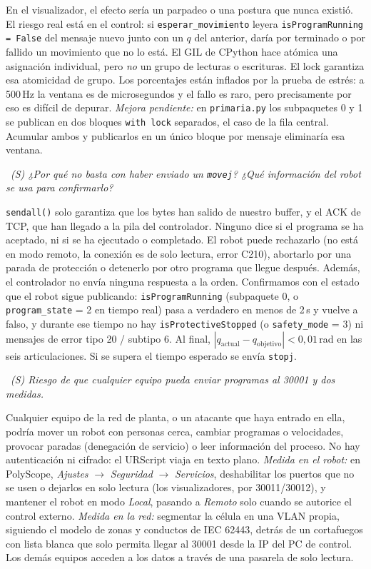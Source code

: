 \documentclass[10pt,a4paper]{article}
\newcommand{\code}[1]{\texttt{\small #1}}
\newcommand{\preg}[2]{\par\smallskip\noindent{\color{azul}\bfseries P#1.}~{\itshape #2}\par\nopagebreak}
\begin{document}
En el visualizador, el efecto sería un parpadeo o una postura que nunca existió. El riesgo real está en el control: si \code{esperar\_movimiento} leyera \code{isProgramRunning = False} del mensaje nuevo junto con un $q$ del anterior, daría por terminado o por fallido un movimiento que no lo está. El GIL de CPython hace atómica una asignación individual, pero \emph{no} un grupo de lecturas o escrituras. El lock garantiza esa atomicidad de grupo. Los porcentajes están inflados por la prueba de estrés: a 500\,Hz la ventana es de microsegundos y el fallo es raro, pero precisamente por eso es difícil de depurar. \emph{Mejora pendiente:} en \code{primaria.py} los subpaquetes 0 y 1 se publican en dos bloques \code{with lock} separados, el caso de la fila central. Acumular ambos y publicarlos en un único bloque por mensaje eliminaría esa ventana.

\preg{9}{(S) ¿Por qué no basta con haber enviado un \code{movej}? ¿Qué información del robot se usa para confirmarlo?}
\code{sendall()} solo garantiza que los bytes han salido de nuestro buffer, y el ACK de TCP, que han llegado a la pila del controlador. Ninguno dice si el programa se ha aceptado, ni si se ha ejecutado o completado. El robot puede rechazarlo (no está en modo remoto, la conexión es de solo lectura, error C210), abortarlo por una parada de protección o detenerlo por otro programa que llegue después. Además, el controlador no envía ninguna respuesta a la orden. Confirmamos con el estado que el robot sigue publicando: \code{isProgramRunning} (subpaquete 0, o \code{program\_state} = 2 en tiempo real) pasa a verdadero en menos de 2\,s y vuelve a falso, y durante ese tiempo no hay \code{isProtectiveStopped} (o \code{safety\_mode} = 3) ni mensajes de error tipo 20 / subtipo 6. Al final, $|q_{\text{actual}}-q_{\text{objetivo}}|<0{,}01$\,rad en las seis articulaciones. Si se supera el tiempo esperado se envía \code{stopj}.

\preg{10}{(S) Riesgo de que cualquier equipo pueda enviar programas al 30001 y dos medidas.}
Cualquier equipo de la red de planta, o un atacante que haya entrado en ella, podría mover un robot con personas cerca, cambiar programas o velocidades, provocar paradas (denegación de servicio) o leer información del proceso. No hay autenticación ni cifrado: el URScript viaja en texto plano. \emph{Medida en el robot:} en PolyScope, \emph{Ajustes} $\rightarrow$ \emph{Seguridad} $\rightarrow$ \emph{Servicios}, deshabilitar los puertos que no se usen o dejarlos en solo lectura (los visualizadores, por 30011/30012), y mantener el robot en modo \emph{Local}, pasando a \emph{Remoto} solo cuando se autorice el control externo. \emph{Medida en la red:} segmentar la célula en una VLAN propia, siguiendo el modelo de zonas y conductos de IEC 62443, detrás de un cortafuegos con lista blanca que solo permita llegar al 30001 desde la IP del PC de control. Los demás equipos acceden a los datos a través de una pasarela de solo lectura.
\end{document}
